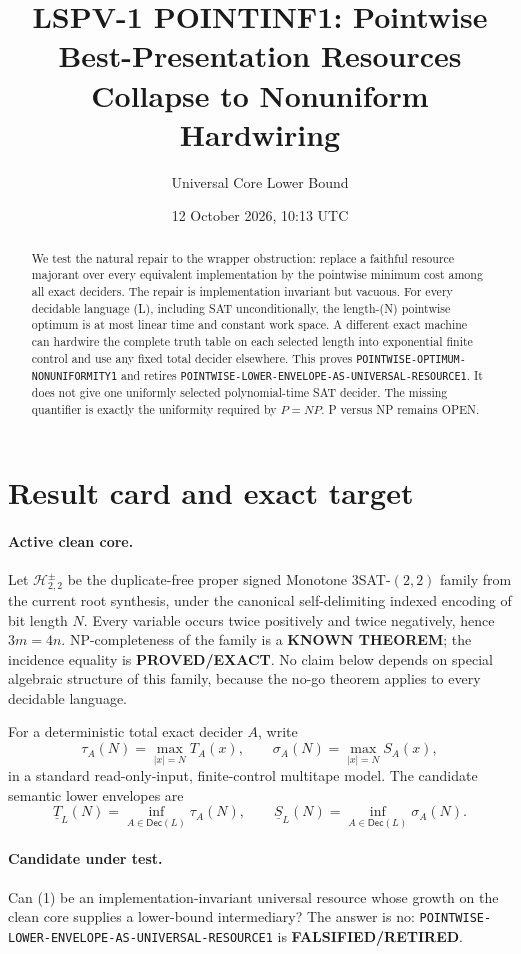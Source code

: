 \documentclass[11pt]{article}
\title{LSPV-1 POINTINF1: Pointwise Best-Presentation Resources Collapse to Nonuniform Hardwiring}
\author{Universal Core Lower Bound}
\date{12 October 2026, 10:13 UTC}
\newcommand{\Dec}{\mathsf{Dec}}
\newcommand{\PROVED}{\textbf{PROVED/EXACT}}
\newcommand{\KNOWN}{\textbf{KNOWN THEOREM}}
\newcommand{\RET}{\textbf{FALSIFIED/RETIRED}}
\begin{document}
\maketitle

\begin{abstract}
We test the natural repair to the wrapper obstruction: replace a faithful
resource majorant over every equivalent implementation by the pointwise
minimum cost among all exact deciders.  The repair is implementation
invariant but vacuous.  For every decidable language (L), including SAT
unconditionally, the length-(N) pointwise optimum is at most linear time
and constant work space.  A different exact machine can hardwire the complete
truth table on each selected length into exponential finite control and use
any fixed total decider elsewhere.  This proves
\texttt{POINTWISE-OPTIMUM-NONUNIFORMITY1} and retires
\texttt{POINTWISE-LOWER-ENVELOPE-AS-UNIVERSAL-RESOURCE1}.  It does not give
one uniformly selected polynomial-time SAT decider.  The missing quantifier
is exactly the uniformity required by \(P=NP\).  P versus NP remains OPEN.
\end{abstract}

\section{Result card and exact target}

\paragraph{Active clean core.}
Let \(\mathcal H^{\pm}_{2,2}\) be the duplicate-free proper signed
Monotone \(3\)SAT-\((2,2)\) family from the current root synthesis, under the
canonical self-delimiting indexed encoding of bit length \(N\).  Every
variable occurs twice positively and twice negatively, hence \(3m=4n\).
NP-completeness of the family is a \KNOWN; the incidence equality is
\PROVED.  No claim below depends on special algebraic structure of this
family, because the no-go theorem applies to every decidable language.

For a deterministic total exact decider \(A\), write
\[
 \tau_A(N)=\max_{|x|=N}T_A(x),\qquad
 \sigma_A(N)=\max_{|x|=N}S_A(x),
\]
in a standard read-only-input, finite-control multitape model.  The candidate
semantic lower envelopes are
\[
 \underline T_L(N)=\inf_{A\in\Dec(L)}\tau_A(N),\qquad
 \underline S_L(N)=\inf_{A\in\Dec(L)}\sigma_A(N).
 \tag{1}
\]

\paragraph{Candidate under test.}
Can (1) be an implementation-invariant universal resource whose growth on
the clean core supplies a lower-bound intermediary?  The answer is no:
\texttt{POINTWISE-LOWER-ENVELOPE-AS-UNIVERSAL-RESOURCE1} is \RET.
\end{document}

